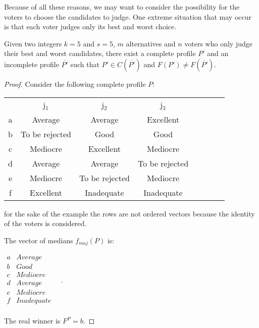 \documentclass[version=3.21, pagesize, twoside=off, bibliography=totoc, DIV=calc, fontsize=12pt, a4paper]{scrartcl}
\begin{document}
Because of all these reasons, we may want to consider the possibility for the voters to choose the candidates to judge. One extreme situation that may occur is that each voter judges only its best and worst choice. 

\begin{proposition}
	Given two integers $k=5$ and $s=5$, $m$ alternatives and $n$ voters who only judge their best and worst candidates, there exist a complete profile $P'$ and an incomplete profile $\overline{P'}$ such that $P'\in C(\overline{P'})$ and $F(P')\neq F(\overline{P'})$.
\end{proposition}	

\begin{proof} Consider the following complete profile $P$:
	
	\begin{center}
		\begin{tabular}{cccccccc}
			& j$_1$ & j$_2$ & j$_3$ \\
			a	&	Average	&	Average	&	Excellent	\\
			b	&	To be rejected	&	Good	&	Good	\\
			c	&	Mediocre	&	Excellent	&	Mediocre	\\
			d	&	Average	&	Average	&	To be rejected	\\
			e	&	Mediocre	&	To be rejected	&	Mediocre	\\
			f	&	Excellent	&	Inadequate	&	Inadequate \\
		\end{tabular}
	\end{center}
	
	
	for the sake of the example the rows are not ordered vectors because the identity of the voters is considered.
	
	The vector of medians $f_{maj}(P)$ is:
	\begin{center}
		$
		\begin{array}{cc}
			a &	Average \\
			b &	Good \\
			c &	Mediocre \\
			d &	Average	\\
			e &	Mediocre \\
			f & Inadequate \\
		\end{array} \quad.
		$
	\end{center}
	The real winner is $F^P=b$. 
	

\end{proof}
\end{document}
